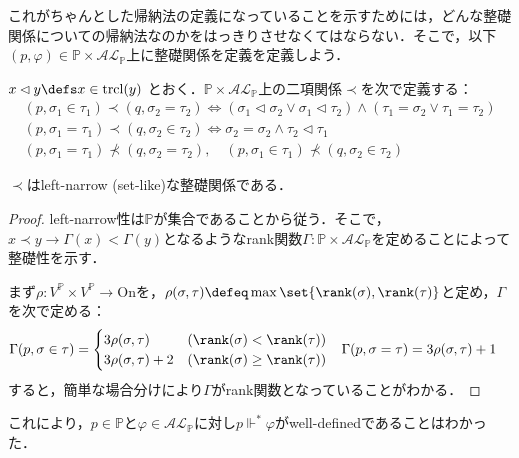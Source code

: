 \documentclass[a4j]{ltjsarticle}
\theoremstyle{definition}
\begin{document}
これがちゃんとした帰納法の定義になっていることを示すためには，どんな整礎関係についての帰納法なのかをはっきりさせなくてはならない．そこで，以下$(p, \varphi) \in \mathbb{P} \times \mathcal{AL}_\mathbb{P}$上に整礎関係を定義を定義しよう．

\begin{definition}
 $x \lhd y \defs x \in \mathrm{trcl}(y)$ とおく．$\mathbb{P} \times \mathcal{AL}_\mathbb{P}$上の二項関係$\prec$を次で定義する：
 \begin{gather*}
  (p, \sigma_1 \in \tau_1) \prec (q, \sigma_2 = \tau_2) \Leftrightarrow (\sigma_1 \lhd \sigma_2 \vee \sigma_1 \lhd \tau_2) \wedge (\tau_1 = \sigma_2 \vee \tau_1 = \tau_2)\\
  (p, \sigma_1 = \tau_1) \prec (q, \sigma_2 \in \tau_2) \Leftrightarrow \sigma_2 = \sigma_2 \wedge \tau_2 \lhd \tau_1\\
  (p, \sigma_1 = \tau_1) \not\prec (q, \sigma_2 = \tau_2), \quad
  (p, \sigma_1 \in \tau_1) \not\prec (q, \sigma_2 \in \tau_2) 
 \end{gather*}
\end{definition}

\begin{claim}
 $\prec$はleft-narrow (set-like)な整礎関係である．
\end{claim}
\begin{proof}
 left-narrow性は$\mathbb{P}$が集合であることから従う．そこで，$x \prec y \rightarrow \Gamma(x) < \Gamma(y)$となるようなrank関数$\Gamma : \mathbb{P} \times \mathcal{AL}_\mathbb{P}$を定めることによって整礎性を示す．

 まず$\rho: V^\mathbb{P}\times V^\mathbb{P}\rightarrow \mathrm{On}$を，$\rho(\sigma, \tau) \defeq  \max\set{\rank(\sigma),\rank(\tau)}$と定め，$\Gamma$を次で定める：
 \begin{align*}
  \Gamma(p, \sigma \in \tau) &= \begin{cases}
				 3 \rho(\sigma, \tau) & (\rank(\sigma) < \rank(\tau))\\
				 3 \rho(\sigma, \tau) + 2 & (\rank(\sigma) \geq \rank(\tau))				 
				\end{cases} &
  \Gamma(p, \sigma = \tau) &= 3 \rho(\sigma, \tau) + 1
 \end{align*}
 すると，簡単な場合分けにより$\Gamma$がrank関数となっていることがわかる．\mbox{}
\end{proof}

これにより，$p \in \mathbb{P}$と$\varphi \in \mathcal{AL}_\mathbb{P}$に対し$p \mathrel{\Vdash^*} \varphi$がwell-definedであることはわかった．
\end{document}
